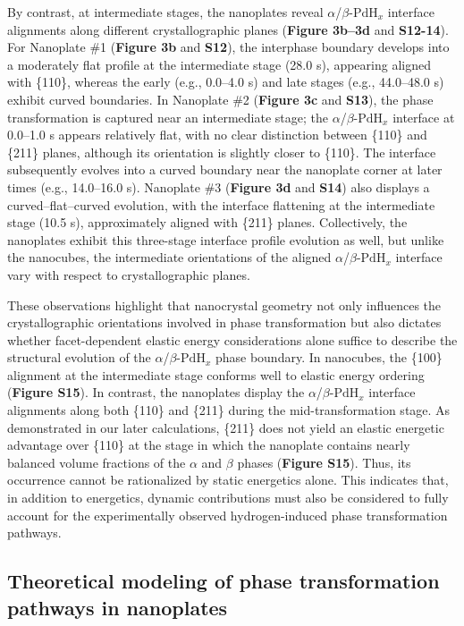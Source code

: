 \documentclass[reprint,amsmath,amssymb,aip,nofootinbib, citeautoscript,]{revtex4-2}
\begin{document}
By contrast, at intermediate stages, the nanoplates reveal $\alpha$/$\beta$-$\mathrm{PdH}_x$ interface alignments along different crystallographic planes (\textbf{Figure 3b–3d} and \textbf{S12-14}). For Nanoplate \#1 (\textbf{Figure 3b} and \textbf{S12}), the interphase boundary develops into a moderately flat profile at the intermediate stage (28.0 s), appearing aligned with \{110\}, whereas the early (e.g., 0.0–4.0 s) and late stages (e.g., 44.0–48.0 s) exhibit curved boundaries. In Nanoplate \#2 (\textbf{Figure 3c} and \textbf{S13}), the phase transformation is captured near an intermediate stage; the $\alpha$/$\beta$-$\mathrm{PdH}_x$ interface at 0.0–1.0 s appears relatively flat, with no clear distinction between \{110\} and \{211\} planes, although its orientation is slightly closer to \{110\}. The interface subsequently evolves into a curved boundary near the nanoplate corner at later times (e.g., 14.0–16.0 s). Nanoplate \#3 (\textbf{Figure 3d} and \textbf{S14}) also displays a curved–flat–curved evolution, with the interface flattening at the intermediate stage (10.5 s), approximately aligned with \{211\} planes. Collectively, the nanoplates exhibit this three-stage interface profile evolution as well, but unlike the nanocubes, the intermediate orientations of the aligned $\alpha$/$\beta$-$\mathrm{PdH}_x$ interface vary with respect to crystallographic planes.


These observations highlight that nanocrystal geometry not only influences the crystallographic orientations involved in phase transformation but also dictates whether facet-dependent elastic energy considerations alone suffice to describe the structural evolution of the $\alpha$/$\beta$-$\mathrm{PdH}_x$ phase boundary. In nanocubes, the \{100\} alignment at the intermediate stage conforms well to elastic energy ordering (\textbf{Figure S15}). In contrast, the nanoplates display the $\alpha$/$\beta$-$\mathrm{PdH}_x$ interface alignments along both \{110\} and \{211\} during the mid-transformation stage. As demonstrated in our later calculations, \{211\} does not yield an elastic energetic advantage over \{110\} at the stage in which the nanoplate contains nearly balanced volume fractions of the $\alpha$ and $\beta$ phases (\textbf{Figure S15}). Thus, its occurrence cannot be rationalized by static energetics alone. This indicates that, in addition to energetics, dynamic contributions must also be considered to fully account for the experimentally observed hydrogen-induced phase transformation pathways.

\subsection*{Theoretical modeling of phase transformation pathways in nanoplates}
\end{document}
